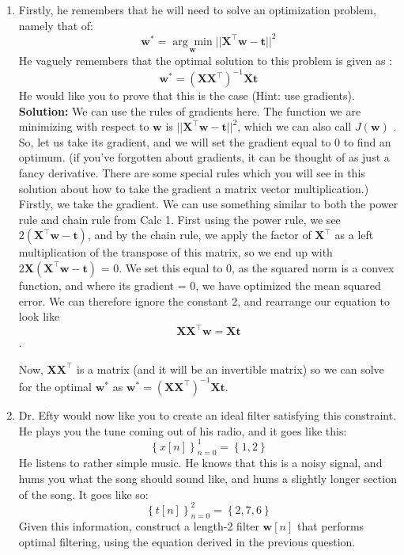 \documentclass{article}
\begin{document}
\begin{enumerate}
    \item Firstly, he remembers that he will need to solve an optimization problem, namely that of:
    $$\boldsymbol{w^*} = \underset{\boldsymbol{w}}{\arg\min} ||\boldsymbol{X^\top w} - \boldsymbol{t}||^2$$
    He vaguely remembers that the optimal solution to this problem is given as :
    $$\boldsymbol{w^*} = (\boldsymbol{XX^\top})^{-1}\boldsymbol{Xt}$$
    He would like you to prove that this is the case (Hint: use gradients).
    \\
    
    \textbf{Solution:}
    We can use the rules of gradients here. The function we are minimizing with respect to $\boldsymbol{w}$ is $||\boldsymbol{X^\top w} - \boldsymbol{t}||^2$, which we can also call $J(\boldsymbol{w})$ . So, let us take its gradient, and we will set the gradient equal to 0 to find an optimum. (if you've forgotten about gradients, it can be thought of as just a fancy derivative. There are some special rules which you will see in this solution about how to take the gradient a matrix vector multiplication.)\\
    
    Firstly, we take the gradient. We can use something similar to both the power rule and chain rule from Calc 1. First using the power rule, we see $2(\boldsymbol{X^\top w} - \boldsymbol{t})$, and by the chain rule, we apply the factor of $\boldsymbol{X^\top}$ as a left multiplication of the transpose of this matrix, so we end up with $2\boldsymbol{X}(\boldsymbol{X^\top w - t})$ = 0. We set this equal to 0, as the squared norm is a convex function, and where its gradient = 0, we have optimized the mean squared error. We can therefore ignore the constant 2, and rearrange our equation to look like 
    $$\boldsymbol{X}\boldsymbol{X^\top w} = \boldsymbol{Xt}$$.

    Now, $\boldsymbol{X}\boldsymbol{X^\top}$ is a matrix (and it will be an invertible matrix) so we can solve for the optimal $\boldsymbol{w^*}$ as $\boldsymbol{w^*} = (\boldsymbol{XX^\top})^{-1}\boldsymbol{Xt}$. 

    \newpage
    
    \item Dr. Efty would now like you to create an ideal filter satisfying this constraint. He plays you the tune coming out of his radio, and it goes like this:
    $$\left\{x[n]\right\}_{n=0}^{1} = \left\{ 1, 2 \right\}$$
    He listens to rather simple music. He knows that this is a noisy signal, and hums you what the song should sound like, and hums a slightly longer section of the song. It goes like so:
    $$\left\{t[n]\right\}_{n=0}^{2} = \left\{ 2, 7, 6 \right\}$$
    Given this information, construct a length-2 filter $\boldsymbol{w}[n]$ that performs optimal filtering, using the equation derived in the previous question.\\


\end{enumerate}
\end{document}
